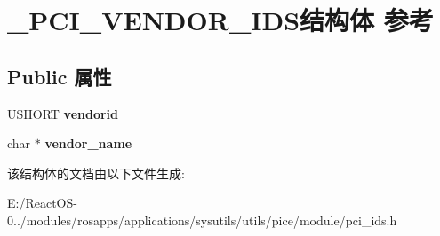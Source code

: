 \hypertarget{struct___p_c_i___v_e_n_d_o_r___i_d_s}{}\section{\+\_\+\+P\+C\+I\+\_\+\+V\+E\+N\+D\+O\+R\+\_\+\+I\+D\+S结构体 参考}
\label{struct___p_c_i___v_e_n_d_o_r___i_d_s}
\subsection*{Public 属性}
\begin{DoxyCompactItemize}
\item 
\mbox{\label{struct___p_c_i___v_e_n_d_o_r___i_d_s_a9e1de847b8e0ea170079e08b2b7c62b1}} 
U\+S\+H\+O\+RT {\bfseries vendorid}
\item 
\mbox{\label{struct___p_c_i___v_e_n_d_o_r___i_d_s_ac4da7cbc3001f06a706a6311d26d4432}} 
char $\ast$ {\bfseries vendor\+\_\+name}
\end{DoxyCompactItemize}


该结构体的文档由以下文件生成\+:\begin{DoxyCompactItemize}
\item 
E\+:/\+React\+O\+S-\/0../modules/rosapps/applications/sysutils/utils/pice/module/pci\+\_\+ids.\+h\end{DoxyCompactItemize}
